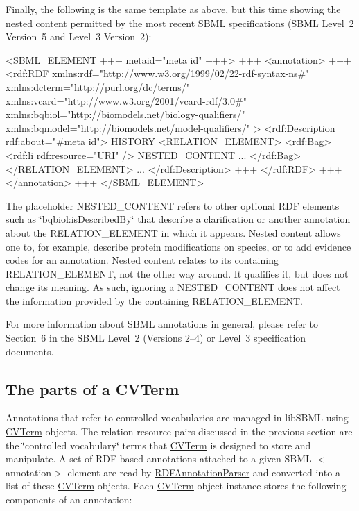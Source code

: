 Finally, the following is the same template as above, but this time showing the nested content permitted by the most recent S\+B\+ML specifications (S\+B\+ML Level~2 Version~5 and Level~3 Version~2)\+: 
\begin{DoxyPre}
<SBML\_ELEMENT +++ metaid="meta id" +++>
  +++
  <annotation>
    +++
    <rdf:RDF xmlns:rdf="http://www.w3.org/1999/02/22-rdf-syntax-ns#"
             xmlns:dcterm="http://purl.org/dc/terms/"
             xmlns:vcard="http://www.w3.org/2001/vcard-rdf/3.0#"
             xmlns:bqbiol="http://biomodels.net/biology-qualifiers/"
             xmlns:bqmodel="http://biomodels.net/model-qualifiers/" >
      <rdf:Description rdf:about="\#meta id">
        HISTORY
        <RELATION\_ELEMENT>
          <rdf:Bag>
            <rdf:li rdf:resource="URI" />
            NESTED\_CONTENT
            ...
          </rdf:Bag>
        </RELATION\_ELEMENT>
        ...
      </rdf:Description>
      +++
    </rdf:RDF>
    +++
  </annotation>
  +++
</SBML\_ELEMENT>
\end{DoxyPre}


The placeholder N\+E\+S\+T\+E\+D\+\_\+\+C\+O\+N\+T\+E\+NT refers to other optional R\+DF elements such as {\ttfamily \char`\"{}bqbiol\+:is\+Described\+By\char`\"{}} that describe a clarification or another annotation about the R\+E\+L\+A\+T\+I\+O\+N\+\_\+\+E\+L\+E\+M\+E\+NT in which it appears. Nested content allows one to, for example, describe protein modifications on species, or to add evidence codes for an annotation. Nested content relates to its containing R\+E\+L\+A\+T\+I\+O\+N\+\_\+\+E\+L\+E\+M\+E\+NT, not the other way around. It qualifies it, but does not change its meaning. As such, ignoring a N\+E\+S\+T\+E\+D\+\_\+\+C\+O\+N\+T\+E\+NT does not affect the information provided by the containing R\+E\+L\+A\+T\+I\+O\+N\+\_\+\+E\+L\+E\+M\+E\+NT.

For more information about S\+B\+ML annotations in general, please refer to Section~6 in the S\+B\+ML Level~2 (Versions 2--4) or Level~3 specification documents.\hypertarget{class_c_v_term_cvterm-parts}{}\subsection{The parts of a C\+V\+Term}\label{class_c_v_term_cvterm-parts}
Annotations that refer to controlled vocabularies are managed in lib\+S\+B\+ML using \hyperlink{class_c_v_term}{C\+V\+Term} objects. The relation-\/resource pairs discussed in the previous section are the \char`\"{}controlled vocabulary\char`\"{} terms that \hyperlink{class_c_v_term}{C\+V\+Term} is designed to store and manipulate. A set of R\+D\+F-\/based annotations attached to a given S\+B\+ML {\ttfamily $<$annotation$>$} element are read by \hyperlink{class_r_d_f_annotation_parser}{R\+D\+F\+Annotation\+Parser} and converted into a list of these \hyperlink{class_c_v_term}{C\+V\+Term} objects. Each \hyperlink{class_c_v_term}{C\+V\+Term} object instance stores the following components of an annotation\+:



